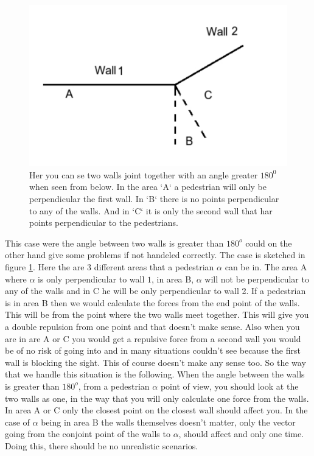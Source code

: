 \begin{figure}
\centering
\includegraphics[scale=0.5]{figures/Thewall.pdf}
\caption{Her you can se two walls joint together with an angle greater $180^0$ when seen from below. In the area `A` a pedestrian will only be perpendicular the first wall. In `B` there is no points perpendicular to any of the walls. And in `C` it is only the second wall that har points perpendicular to the pedestrians.  }
\label{fig:wallcase}
\end{figure}

This case were the angle between two walls is greater than $180^o$ could on the other hand give some problems if not handeled correctly. The case is sketched in figure \ref{fig:wallcase}. Here the are 3 different areas that a pedestrian $\alpha$ can be in. The area A where $\alpha$ is only perpendicular to wall $1$, in area B, $\alpha$ will not be perpendicular to any of the walls and in C he will be only perpendicular to wall 2. If a pedestrian is in area B then we would calculate the forces from the end point of the walls. This will be from the point where the two walls meet together. This will give you a double repulsion from one point and that doesn't make sense. Also when you are in are A or C you would get a repulsive force from a second wall you would be of no risk of going into and in many situations couldn't see because the first wall is blocking the sight. This of course doesn't make any sense too. So the way that we handle this situation is the following. When the angle between the walls is greater than $180^o$, from a pedestrian $\alpha$ point of view, you should look at the two walls as one, in the way that you will only calculate one force from the walls. In area A or C only the closest point on the closest wall should affect you. In the case of $\alpha$ being in area B the walls themselves   doesn't matter, only the vector going from the conjoint point of the walls to $\alpha$, should affect and only one time. Doing this, there should be no unrealistic scenarios.


